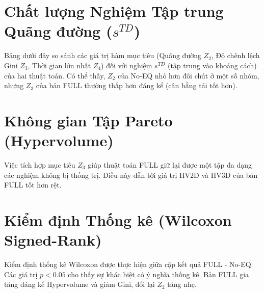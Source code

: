 \documentclass[12pt,a4paper]{article}
\begin{document}

\begin{table}[H]
    \centering
    \caption{Tỷ lệ Success Rate (SR \%) đạt Common Fleet Target (chỉ tính quy mô \_21)}
    
\end{table}

\section{Chất lượng Nghiệm Tập trung Quãng đường ($s^{TD}$)}
Bảng dưới đây so sánh các giá trị hàm mục tiêu (Quãng đường $Z_2$, Độ chênh lệch Gini $Z_3$, Thời gian lớn nhất $Z_4$) đối với nghiệm $s^{TD}$ (tập trung vào khoảng cách) của hai thuật toán. Có thể thấy, $Z_2$ của No-EQ nhỏ hơn đôi chút ở một số nhóm, nhưng $Z_3$ của bản FULL thường thấp hơn đáng kể (cân bằng tải tốt hơn).

\begin{table}[H]
    \centering
    \caption{So sánh Hàm Mục tiêu của Nghiệm TD (Trung bình theo nhóm \_21)}
    
\end{table}

\section{Không gian Tập Pareto (Hypervolume)}
Việc tích hợp mục tiêu $Z_3$ giúp thuật toán FULL giữ lại được một tập đa dạng các nghiệm không bị thống trị. Điều này dẫn tới giá trị HV2D và HV3D của bản FULL tốt hơn rệt.

\begin{table}[H]
    \centering
    \caption{Hypervolume (HV2D và HV3D) Trung bình theo Nhóm (\_21)}
    
\end{table}

\section{Kiểm định Thống kê (Wilcoxon Signed-Rank)}
Kiểm định thống kê Wilcoxon được thực hiện giữa cặp kết quả FULL - No-EQ. Các giá trị $p < 0.05$ cho thấy sự khác biệt có ý nghĩa thống kê. Bản FULL gia tăng đáng kể Hypervolume và giảm Gini, đổi lại $Z_2$ tăng nhẹ.

\begin{table}[H]
    \centering
    \caption{Kiểm định Wilcoxon (FULL - No-EQ) trên các instance \_21}
    
\end{table}
\end{document}
